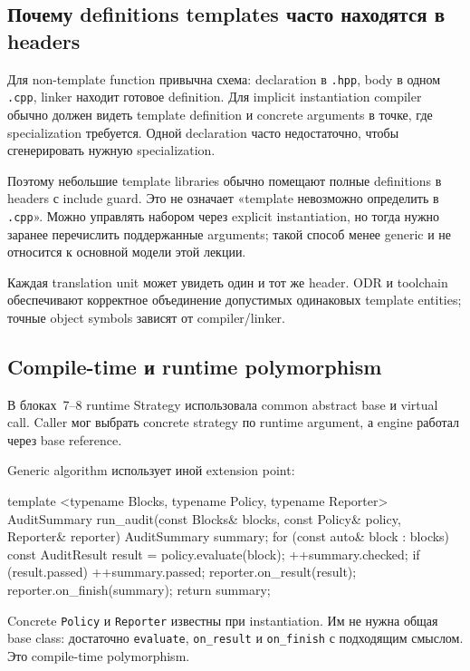 \subsection{Почему definitions templates часто находятся в headers}

Для non-template function привычна схема: declaration в \texttt{.hpp}, body в
одном \texttt{.cpp}, linker находит готовое definition. Для implicit
instantiation compiler обычно должен видеть template definition и concrete
arguments в точке, где specialization требуется. Одной declaration часто
недостаточно, чтобы сгенерировать нужную specialization.

Поэтому небольшие template libraries обычно помещают полные definitions в
headers с include guard. Это не означает «template невозможно определить в
\texttt{.cpp}». Можно управлять набором через explicit instantiation, но тогда
нужно заранее перечислить поддержанные arguments; такой способ менее generic
и не относится к основной модели этой лекции.

Каждая translation unit может увидеть один и тот же header. ODR и toolchain
обеспечивают корректное объединение допустимых одинаковых template entities;
точные object symbols зависят от compiler/linker.

\subsection{Compile-time и runtime polymorphism}

В блоках~7--8 runtime Strategy использовала common abstract base и virtual
call. Caller мог выбрать concrete strategy по runtime argument, а engine
работал через base reference.

Generic algorithm использует иной extension point:

\begin{cppcode}
template <typename Blocks, typename Policy, typename Reporter>
AuditSummary run_audit(const Blocks& blocks,
                       const Policy& policy,
                       Reporter& reporter) {
    AuditSummary summary;
    for (const auto& block : blocks) {
        const AuditResult result = policy.evaluate(block);
        ++summary.checked;
        if (result.passed) {
            ++summary.passed;
        }
        reporter.on_result(result);
    }
    reporter.on_finish(summary);
    return summary;
}
\end{cppcode}

Concrete \texttt{Policy} и \texttt{Reporter} известны при instantiation. Им
не нужна общая base class: достаточно \texttt{evaluate}, \texttt{on\_result}
и \texttt{on\_finish} с подходящим смыслом. Это compile-time polymorphism.

